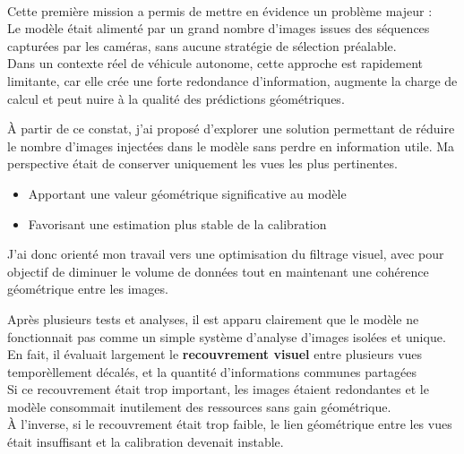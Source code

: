 \documentclass[12pt,a4paper,oneside]{report}
\newcommand{\textsb}[1]{{\fontseries{sb}\selectfont #1}}
\begin{document}
\paragraph{} \vspace{-\baselineskip}
 Cette première mission a permis de mettre en évidence un problème majeur :\\
Le modèle était alimenté par un grand nombre d'images issues des séquences capturées par les caméras, sans aucune stratégie de sélection préalable.\\
 Dans un contexte réel de véhicule autonome, cette approche est rapidement limitante, car elle crée une forte redondance d'information, augmente la charge de calcul et peut nuire à la qualité des prédictions géométriques.

 À partir de ce constat, j'ai proposé d'explorer une solution permettant de réduire le nombre d'images injectées dans le modèle sans perdre en information utile.
\newpage
 Ma perspective était de conserver uniquement les vues les plus pertinentes.
\begin{itemize}[label=\textsb{\textendash}]
	\item \textsb{Apportant une valeur géométrique significative au modèle}
	\item \textsb{Favorisant une estimation plus stable de la calibration}
\end{itemize}

\hspace*{.3cm} J'ai donc orienté mon travail vers une optimisation du filtrage visuel, avec pour objectif de diminuer le volume de données tout en maintenant une cohérence géométrique entre les images.

\hspace*{.3cm} Après plusieurs tests et analyses, il est apparu clairement que le modèle ne fonctionnait pas comme un simple système d'analyse d'images isolées et unique.\\
 En fait, il évaluait largement le \textbf{recouvrement visuel} entre plusieurs vues temporèllement décalés, et la quantité d'informations communes partagées \\
\hspace*{.3cm} Si ce recouvrement était trop important, les images étaient redondantes et le modèle consommait inutilement des ressources sans gain géométrique. \\
\hspace*{.3cm} À l'inverse, si le recouvrement était trop faible, le lien géométrique entre les vues était insuffisant et la calibration devenait instable.
\end{document}

